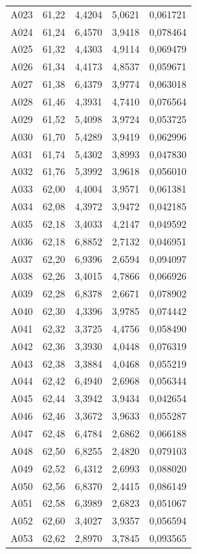 \begin{longtable}{lrrrr}
A023 & 61,22 & 4,4204 & 5,0621 & 0,061721 \\
A024 & 61,24 & 6,4570 & 3,9418 & 0,078464 \\
A025 & 61,32 & 4,4303 & 4,9114 & 0,069479 \\
A026 & 61,34 & 4,4173 & 4,8537 & 0,059671 \\
A027 & 61,38 & 6,4379 & 3,9774 & 0,063018 \\
A028 & 61,46 & 4,3931 & 4,7410 & 0,076564 \\
A029 & 61,52 & 5,4098 & 3,9724 & 0,053725 \\
A030 & 61,70 & 5,4289 & 3,9419 & 0,062996 \\
A031 & 61,74 & 5,4302 & 3,8993 & 0,047830 \\
A032 & 61,76 & 5,3992 & 3,9618 & 0,056010 \\
A033 & 62,00 & 4,4004 & 3,9571 & 0,061381 \\
A034 & 62,08 & 4,3972 & 3,9472 & 0,042185 \\
A035 & 62,18 & 3,4033 & 4,2147 & 0,049592 \\
A036 & 62,18 & 6,8852 & 2,7132 & 0,046951 \\
A037 & 62,20 & 6,9396 & 2,6594 & 0,094097 \\
A038 & 62,26 & 3,4015 & 4,7866 & 0,066926 \\
A039 & 62,28 & 6,8378 & 2,6671 & 0,078902 \\
A040 & 62,30 & 4,3396 & 3,9785 & 0,074442 \\
A041 & 62,32 & 3,3725 & 4,4756 & 0,058490 \\
A042 & 62,36 & 3,3930 & 4,0448 & 0,076319 \\
A043 & 62,38 & 3,3884 & 4,0468 & 0,055219 \\
A044 & 62,42 & 6,4940 & 2,6968 & 0,056344 \\
A045 & 62,44 & 3,3942 & 3,9434 & 0,042654 \\
A046 & 62,46 & 3,3672 & 3,9633 & 0,055287 \\
A047 & 62,48 & 6,4784 & 2,6862 & 0,066188 \\
A048 & 62,50 & 6,8255 & 2,4820 & 0,079103 \\
A049 & 62,52 & 6,4312 & 2,6993 & 0,088020 \\
A050 & 62,56 & 6,8370 & 2,4415 & 0,086149 \\
A051 & 62,58 & 6,3989 & 2,6823 & 0,051067 \\
A052 & 62,60 & 3,4027 & 3,9357 & 0,056594 \\
A053 & 62,62 & 2,8970 & 3,7845 & 0,093565 \\

\end{longtable}
